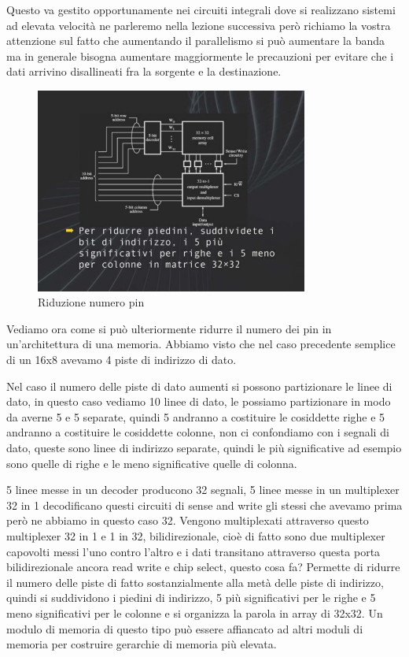 Questo va gestito opportunamente nei circuiti integrali dove si realizzano sistemi ad elevata velocità ne parleremo nella lezione successiva però richiamo la vostra attenzione sul fatto che aumentando il parallelismo si può aumentare la banda ma in generale bisogna aumentare maggiormente le precauzioni per evitare che i dati arrivino disallineati fra la sorgente e la destinazione.

\FloatBarrier
\begin{figure}[H]
  \centering
  \includegraphics[width=0.80\textwidth,
                    trim=40 40 10 40, %
                    clip]
                    {images/Lez04_p02_fig_04.png}
  \caption{Riduzione numero pin}
  \label{fig:Lez04_p02_fig_04}
\end{figure}
\FloatBarrier
\noindent

Vediamo ora come si può ulteriormente ridurre il numero dei pin in un'architettura di una memoria.
Abbiamo visto che nel caso precedente semplice di un 16x8 avevamo 4 piste di indirizzo di dato.

Nel caso il numero delle piste di dato aumenti si possono partizionare le linee di dato, in questo caso vediamo 10 linee di dato, le possiamo partizionare in modo da averne 5 e 5 separate, quindi 5 andranno a costituire le cosiddette righe e 5 andranno a costituire le cosiddette colonne, non ci confondiamo con i segnali di dato, queste sono linee di indirizzo separate, quindi le più significative ad esempio sono quelle di righe e le meno significative quelle di colonna.

5 linee messe in un decoder producono 32 segnali, 5 linee messe in un multiplexer 32 in 1 decodificano questi circuiti di sense and write gli stessi che avevamo prima però ne abbiamo in questo caso 32.
Vengono multiplexati attraverso questo multiplexer 32 in 1 e 1 in 32, bilidirezionale, cioè di fatto sono due multiplexer capovolti messi l'uno contro l'altro e i dati transitano attraverso questa porta bilidirezionale ancora read write e chip select, questo cosa fa?
Permette di ridurre il numero delle piste di fatto sostanzialmente alla metà delle piste di indirizzo, quindi si suddividono i piedini di indirizzo, 5 più significativi per le righe e 5 meno significativi per le colonne e si organizza la parola in array di 32x32.
Un modulo di memoria di questo tipo può essere affiancato ad altri moduli di memoria per costruire gerarchie di memoria più elevata.

